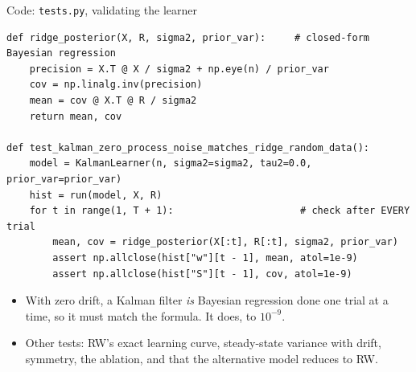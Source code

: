 \documentclass[aspectratio=169,11pt]{beamer}
\begin{document}
\begin{frame}[fragile]{Code: \texttt{tests.py}, validating the learner}
\begin{lstlisting}
def ridge_posterior(X, R, sigma2, prior_var):     # closed-form Bayesian regression
    precision = X.T @ X / sigma2 + np.eye(n) / prior_var
    cov = np.linalg.inv(precision)
    mean = cov @ X.T @ R / sigma2
    return mean, cov

def test_kalman_zero_process_noise_matches_ridge_random_data():
    model = KalmanLearner(n, sigma2=sigma2, tau2=0.0, prior_var=prior_var)
    hist = run(model, X, R)
    for t in range(1, T + 1):                      # check after EVERY trial
        mean, cov = ridge_posterior(X[:t], R[:t], sigma2, prior_var)
        assert np.allclose(hist["w"][t - 1], mean, atol=1e-9)
        assert np.allclose(hist["S"][t - 1], cov, atol=1e-9)
\end{lstlisting}
\vspace{0.3em}
\begin{itemize}\small
\item With zero drift, a Kalman filter \emph{is} Bayesian regression done one trial at a time, so it must match the formula. It does, to $10^{-9}$.
\item Other tests: RW's exact learning curve, steady-state variance with drift, symmetry, the ablation, and that the alternative model reduces to RW.
\end{itemize}
\end{frame}
\end{document}
